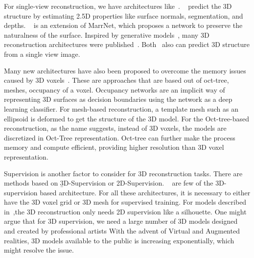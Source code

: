 For single-view reconstruction, we have architectures like~\cite{wu2017marrnet,z-gan, Yang_219, wu2018learning, popov2020corenet}.
~\cite{wu2017marrnet} predict the 3D structure by estimating 2.5D properties like surface normals, segmentation, and depths.
~\cite{wu2018learning} is an extension of MarrNet, which proposes a network to preserve the naturalness of the surface.
Inspired by generative models~\cite{Goodfellow2014GenerativeAN,kingma2014autoencoding}, many 3D reconstruction architectures were published~\cite{z-gan, Yang_219,wu2017learning,Lunz2020InverseGG}.
Both~\cite{Xie_2019, Xie_2020} also can predict 3D structure from a single view image.

Many new architectures have also been proposed to overcome the memory issues caused by 3D voxels~\cite{tatarchenko2017octree,Richter2018MatryoshkaNP,Mescheder2019OccupancyNL,Gkioxari2019MeshR, wang2018pixel2mesh,groueix2018atlasnet,pan2019deep}.
These are approaches that are based out of oct-tree, meshes, occupancy of a voxel.
Occupancy networks are an implicit way of representing 3D surfaces as decision boundaries using the network as a deep learning classifier.
For mesh-based reconstruction, a template mesh such as an ellipsoid is deformed to get the structure of the 3D model.
For the Oct-tree-based reconstruction, as the name suggests, instead of 3D voxels, the models are discretized in Oct-Tree representation.
Oct-tree can further make the process memory and compute efficient, providing higher resolution than 3D voxel representation.

Supervision is another factor to consider for 3D reconstruction tasks.
There are methods based on \b{3D-Supervision or 2D-Supervision}.
~\cite{Xie_2019,Xie_2020,wu2017marrnet,groueix2018atlasnet,pan2019deep, chen2019learning} are few of the 3D-supervision based architecture.
For all these architectures, it is necessary to either have the 3D voxel grid or 3D mesh for supervised training.
For models described in~\cite{Lunz2020InverseGG,henderson2019learning},the 3D reconstruction only needs 2D supervision like a silhouette.
One might argue that for 3D supervision, we need a large number of 3D models designed and created by professional artists
With the advent of Virtual and Augmented realities, 3D models available to the public is increasing exponentially, which might resolve the issue.

